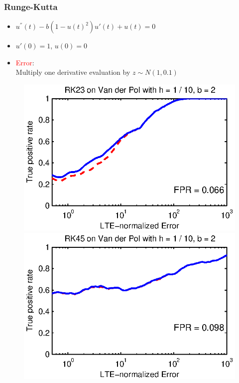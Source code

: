 \documentclass{beamer}
\begin{document}
\begin{frame}
\frametitle{Runge-Kutta}

\begin{itemize}
\item $u^{''}(t) - b(1 - u(t)^2)u'(t) + u(t) = 0$
\item $u'(0) = 1$, $u(0) = 0$
\item \textcolor{red}{Error}: \\
Multiply one derivative evaluation by $z \sim N(1, 0.1)$
\end{itemize}

\begin{figure}
  \includegraphics[scale=0.6]{figs/rk23_vdp_2_func.eps}
  \includegraphics[scale=0.6]{figs/rk45_vdp_2_func.eps}
\end{figure}

\end{frame}
\end{document}
